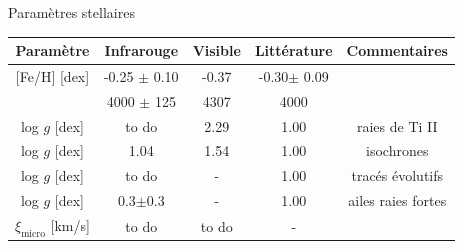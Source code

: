 \documentclass[10pt]{beamer}
\begin{document}
\begin{frame}[fragile]{Paramètres stellaires}
    \begin{table}[h!]
        \begin{center}
            \renewcommand{\arraystretch}{1.5}
            \begin{tabular}{c|ccc|c}
                Paramètre & Infrarouge &Visible& Littérature &Commentaires\\
                \hline
                
                $[$Fe/H$]$ [dex]& -0.25 $\pm$ 0.10 & -0.37 &
                -0.30$\pm$ 0.09&\\
                \arrayrulecolor{red}\hline
                \multicolumn{1}{|c}{T$_{\rm eff}$ [K]} & 4000 $\pm$ 125 &4307 & 4000& \multicolumn{1}{c|}{}\\
                \arrayrulecolor{red}\hline
    
                log $g$ [dex]& to do & 2.29 & 1.00&raies de Ti II\\
                log $g$ [dex]& 1.04 & 1.54 & 1.00 &isochrones\\
                log $g$ [dex]& to do & - & 1.00 &tracés évolutifs\\
                log $g$ [dex] &0.3$\pm$0.3 &-& 1.00 &ailes raies fortes\\
                $\xi_{\text{micro}}$ [km/s]& to do & to do & - &\\
            \end{tabular}
        \end{center}
    \end{table}
    \end{frame}
\end{document}
